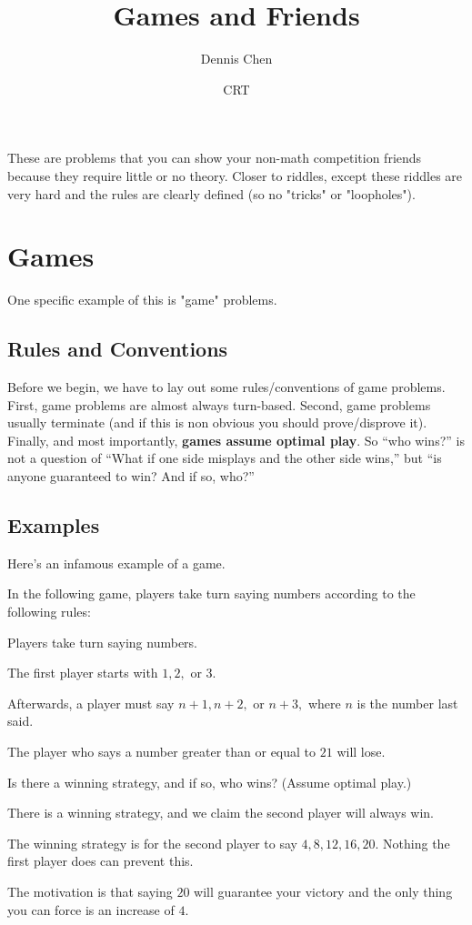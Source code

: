\documentclass{article}
\title{Games and Friends}
\author{Dennis Chen}
\date{CRT}
\begin{document}
\maketitle
These are problems that you can show your non-math competition friends because they require little or no theory. Closer to riddles, except these riddles are very hard and the rules are clearly defined (so no "tricks" or "loopholes").

\section{Games}
One specific example of this is "game" problems.

\subsection{Rules and Conventions}
Before we begin, we have to lay out some rules/conventions of game problems. First, game problems are almost always turn-based. Second, game problems usually terminate (and if this is non obvious you should prove/disprove it). Finally, and most importantly, \textbf{games assume optimal play}. So ``who wins?'' is not a question of ``What if one side misplays and the other side wins,'' but ``is anyone guaranteed to win? And if so, who?''

\subsection{Examples}
Here's an infamous example of a game.

\begin{exam}[21 Game]
In the following game, players take turn saying numbers according to the following rules:
\begin{itemize}
    \Item Players take turn saying numbers.

    \Item The first player starts with $1,2,$ or $3.$
    
    \Item Afterwards, a player must say $n+1,n+2,$ or $n+3,$ where $n$ is the number last said.
    
    \Item The player who says a number greater than or equal to $21$ will lose.
\end{itemize}

Is there a winning strategy, and if so, who wins? (Assume optimal play.)
\end{exam}

\begin{sol}
There is a winning strategy, and we claim the second player will always win.

The winning strategy is for the second player to say $4,8,12,16,20.$ Nothing the first player does can prevent this.
\end{sol}
The motivation is that saying $20$ will guarantee your victory and the only thing you can force is an increase of $4.$
\end{document}
